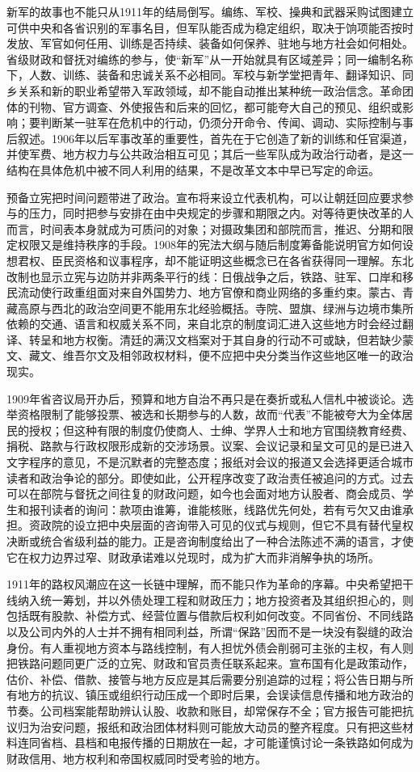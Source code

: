 新军的故事也不能只从1911年的结局倒写。编练、军校、操典和武器采购试图建立可供中央和各省识别的军事名目，但军队能否成为稳定组织，取决于饷项能否按时发放、军官如何任用、训练是否持续、装备如何保养、驻地与地方社会如何相处。省级财政和督抚对编练的参与，使“新军”从一开始就具有区域差异；同一编制名称下，人数、训练、装备和忠诚关系不必相同。军校与新学堂把青年、翻译知识、同乡关系和新的职业希望带入军政领域，却不能自动推出某种统一政治信念。革命团体的刊物、官方调查、外使报告和后来的回忆，都可能夸大自己的预见、组织或影响；要判断某一驻军在危机中的行动，仍须分开命令、传闻、调动、实际控制与事后叙述。1906年以后军事改革的重要性，首先在于它创造了新的训练和任官渠道，并使军费、地方权力与公共政治相互可见；其后一些军队成为政治行动者，是这一结构在具体危机中被不同人利用的结果，不是改革文本中早已写定的命运。

预备立宪把时间问题带进了政治。宣布将来设立代表机构，可以让朝廷回应要求参与的压力，同时把参与安排在由中央规定的步骤和期限之内。对等待更快改革的人而言，时间表本身就成为可质问的对象；对摄政集团和部院而言，推迟、分期和限定权限又是维持秩序的手段。1908年的宪法大纲与随后制度筹备能说明官方如何设想君权、臣民资格和议事程序，却不能证明这些概念已在各省获得同一理解。东北改制也显示立宪与边防并非两条平行的线：日俄战争之后，铁路、驻军、口岸和移民流动使行政重组面对来自外国势力、地方官僚和商业网络的多重约束。蒙古、青藏高原与西北的政治空间更不能用东北经验概括。寺院、盟旗、绿洲与边境市集所依赖的交通、语言和权威关系不同，来自北京的制度词汇进入这些地方时会经过翻译、转呈和地方权衡。清廷的满汉文档案对于其自身的行动不可或缺，但若缺少蒙文、藏文、维吾尔文及相邻政权材料，便不应把中央分类当作这些地区唯一的政治现实。

1909年省咨议局开办后，预算和地方自治不再只是在奏折或私人信札中被谈论。选举资格限制了能够投票、被选和长期参与的人数，故而“代表”不能被夸大为全体居民的授权；但这种有限的制度仍使商人、士绅、学界人士和地方官围绕教育经费、捐税、路款与行政权限形成新的交涉场景。议案、会议记录和呈文可见的是已进入文字程序的意见，不是沉默者的完整态度；报纸对会议的报道又会选择更适合城市读者和政治争论的部分。即使如此，公开程序改变了政治责任被追问的方式。过去可以在部院与督抚之间往复的财政问题，如今也会面对地方认股者、商会成员、学生和报刊读者的询问：款项由谁筹，谁能核账，线路优先何处，若有亏欠又由谁承担。资政院的设立把中央层面的咨询带入可见的仪式与规则，但它不具有替代皇权决断或统合省级利益的能力。正是咨询制度给出了一种合法陈述不满的语言，才使它在权力边界过窄、财政承诺难以兑现时，成为扩大而非消解争执的场所。

1911年的路权风潮应在这一长链中理解，而不能只作为革命的序幕。中央希望把干线纳入统一筹划，并以外债处理工程和财政压力；地方投资者及其组织担心的，则包括既有股款、补偿方式、经营位置与借款后权利如何改变。不同省份、不同线路以及公司内外的人士并不拥有相同利益，所谓“保路”因而不是一块没有裂缝的政治身份。有人重视地方资本与路线控制，有人担忧外债会削弱可主张的主权，有人则把铁路问题同更广泛的立宪、财政和官员责任联系起来。宣布国有化是政策动作，估价、补偿、借款、接管与地方反应是其后需要分别追踪的过程；将公告日期与所有地方的抗议、镇压或组织行动压成一个即时后果，会误读信息传播和地方政治的节奏。公司档案能帮助辨认认股、收款和账目，却常保存不全；官方报告可能把抗议归为治安问题，报纸和政治团体材料则可能放大动员的整齐程度。只有把这些材料连同省档、县档和电报传播的日期放在一起，才可能谨慎讨论一条铁路如何成为财政信用、地方权利和帝国权威同时受考验的地方。


